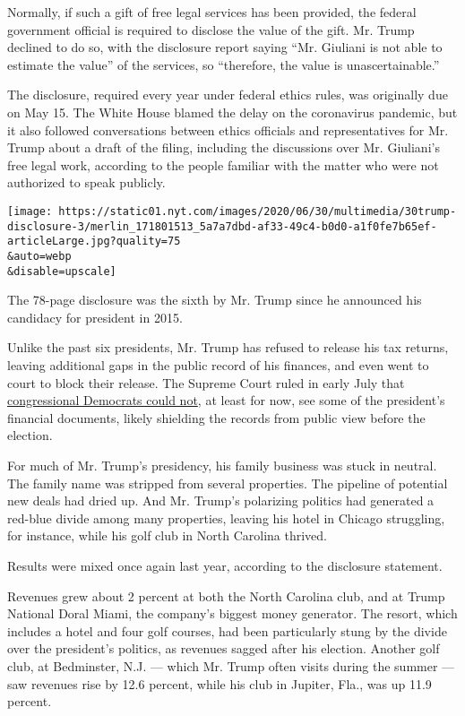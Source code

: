 Normally, if such a gift of free legal services has been provided, the
federal government official is required to disclose the value of the
gift. Mr. Trump declined to do so, with the disclosure report saying
``Mr. Giuliani is not able to estimate the value'' of the services, so
``therefore, the value is unascertainable.''

The disclosure, required every year under federal ethics rules, was
originally due on May 15. The White House blamed the delay on the
coronavirus pandemic, but it also followed conversations between ethics
officials and representatives for Mr. Trump about a draft of the filing,
including the discussions over Mr. Giuliani's free legal work, according
to the people familiar with the matter who were not authorized to speak
publicly.

\texttt{[image: https://static01.nyt.com/images/2020/06/30/multimedia/30trump-disclosure-3/merlin\_171801513\_5a7a7dbd-af33-49c4-b0d0-a1f0fe7b65ef-articleLarge.jpg?quality=75\\\&auto=webp\\\&disable=upscale]}

The 78-page disclosure was the sixth by Mr. Trump since he announced his
candidacy for president in 2015.

Unlike the past six presidents, Mr. Trump has refused to release his tax
returns, leaving additional gaps in the public record of his finances,
and even went to court to block their release. The Supreme Court ruled
in early July that
\href{https://www.supremecourt.gov/opinions/19pdf/19-715_febh.pdf}{congressional
Democrats could not}, at least for now, see some of the president's
financial documents, likely shielding the records from public view
before the election.

For much of Mr. Trump's presidency, his family business was stuck in
neutral. The family name was stripped from several properties. The
pipeline of potential new deals had dried up. And Mr. Trump's polarizing
politics had generated a red-blue divide among many properties, leaving
his hotel in Chicago struggling, for instance, while his golf club in
North Carolina thrived.

Results were mixed once again last year, according to the disclosure
statement.

Revenues grew about 2 percent at both the North Carolina club, and at
Trump National Doral Miami, the company's biggest money generator. The
resort, which includes a hotel and four golf courses, had been
particularly stung by the divide over the president's politics, as
revenues sagged after his election. Another golf club, at Bedminster,
N.J. --- which Mr. Trump often visits during the summer --- saw revenues
rise by 12.6 percent, while his club in Jupiter, Fla., was up 11.9
percent.

